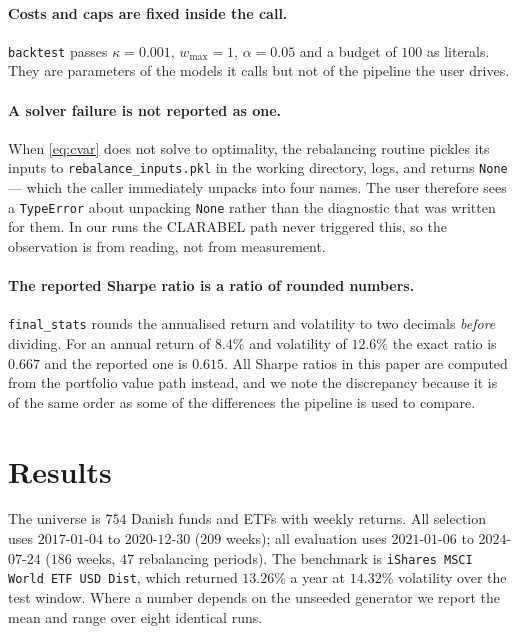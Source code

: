 \documentclass[11pt,a4paper]{article}
\newcommand{\code}[1]{\texttt{#1}}
\begin{document}
\paragraph{Costs and caps are fixed inside the call.}
\code{backtest} passes $\kappa = 0.001$, $w_{\max} = 1$, $\alpha = 0.05$ and a
budget of $100$ as literals. They are parameters of the models it calls but not
of the pipeline the user drives.

\paragraph{A solver failure is not reported as one.}
When \eqref{eq:cvar} does not solve to optimality, the rebalancing routine
pickles its inputs to \code{rebalance\_inputs.pkl} in the working directory,
logs, and returns \code{None} --- which the caller immediately unpacks into
four names. The user therefore sees a \code{TypeError} about unpacking
\code{None} rather than the diagnostic that was written for them. In our runs
the CLARABEL path never triggered this, so the observation is from reading, not
from measurement.

\paragraph{The reported Sharpe ratio is a ratio of rounded numbers.}
\code{final\_stats} rounds the annualised return and volatility to two decimals
\emph{before} dividing. For an annual return of $8.4\%$ and volatility of
$12.6\%$ the exact ratio is $0.667$ and the reported one is $0.615$. All Sharpe
ratios in this paper are computed from the portfolio value path instead, and we
note the discrepancy because it is of the same order as some of the differences
the pipeline is used to compare.

\section{Results}
\label{sec:results}

The universe is $754$ Danish funds and ETFs with weekly returns. All selection
uses $2017$-$01$-$04$ to $2020$-$12$-$30$ ($209$ weeks); all evaluation uses
$2021$-$01$-$06$ to $2024$-$07$-$24$ ($186$ weeks, $47$ rebalancing periods).
The benchmark is \code{iShares MSCI World ETF USD Dist}, which returned
$13.26\%$ a year at $14.32\%$ volatility over the test window. Where a number
depends on the unseeded generator we report the mean and range over eight
identical runs.
\end{document}
